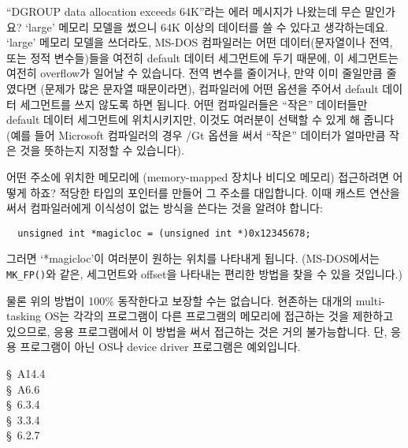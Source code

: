 \begin{faq}
	``DGROUP data allocation exceeds 64K''라는 에러 메시지가
	나왔는데 무슨 말인가요? `large' 메모리 모델을
	썼으니 64K 이상의 데이터를 쓸 수 있다고 생각하는데요.
\A
	`large' 메모리 모델을 쓰더라도, MS-DOS 컴파일러는 
	어떤 데이터(문자열이나 전역, 또는 정적 변수들)들을 여전히
	default 데이터 세그먼트에 두기 때문에, 이 세그먼트는 여전히
	overflow가 일어날 수 있습니다.
	전역 변수를 줄이거나, 만약 이미 줄일만큼 줄였다면 (문제가
	많은 문자열 때문이라면), 컴파일러에 어떤 옵션을 주어서
	default 데이터 세그먼트를 쓰지 않도록 하면 됩니다.
	어떤 컴파일러들은 ``작은'' 데이터들만 default 데이터 세그먼트에
	위치시키지만, 이것도 여러분이 선택할 수 있게 해 줍니다
	(예를 들어 Microsoft 컴파일러의 경우 /Gt 옵션을 써서 ``작은''
	데이터가 얼마만큼 작은 것을 뜻하는지 지정할 수 있습니다).
\end{faq}

\begin{faq}
	어떤 주소에 위치한 메모리에 (memory-mapped 장치나 비디오 메모리)
	접근하려면 어떻게 하죠?
\A
	적당한 타입의 포인터를 만들어 그 주소를 대입합니다.
	이때 캐스트 연산을 써서 컴파일러에게 이식성이 없는 방식을
	쓴다는 것을 알려야 합니다:

\begin{verbatim}
  unsigned int *magicloc = (unsigned int *)0x12345678;
\end{verbatim}

	그러면 `*magicloc'이 여러분이 원하는 위치를 나타내게 됩니다.
	(MS-DOS에서는 \verb+MK_FP()+와 같은, 세그먼트와 offset을
	나타내는 편리한 방법을 찾을 수 있을 것입니다.)

\T
	물론 위의 방법이 100\% 동작한다고 보장할 수는 없습니다.
	현존하는 대개의 multi-tasking OS는 각각의 프로그램이 다른
	프로그램의 메모리에 접근하는 것을 제한하고 있으므로,
	응용 프로그램에서 이 방법을 써서 접근하는 것은 
	거의 불가능합니다.  단, 응용 프로그램이 아닌 OS나 device driver
	프로그램은 예외입니다.

\R
	\cite{kr1} \S\ A14.4  \\
	\cite{kr2} \S\ A6.6  \\
	\cite{c89} \S\ 6.3.4 \\
	\cite{rationale} \S\ 3.3.4 \\
	\cite{hs} \S\ 6.2.7 
\end{faq}

